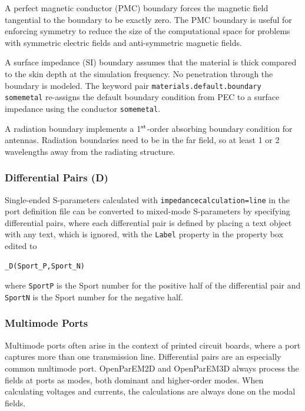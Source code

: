 \documentclass[titlepage]{article}
\renewcommand\_{\textunderscore\linebreak[1]}
\begin{document}
A perfect magnetic conductor (PMC) boundary forces the magnetic field tangential to the boundary to be exactly zero.  The PMC boundary is useful for enforcing symmetry to reduce the size of the computational space for problems with symmetric electric fields and anti-symmetric magnetic fields.

A surface impedance (SI) boundary assumes that the material is thick compared to the skin depth at the simulation frequency.  No penetration through the boundary is modeled.  The keyword pair \newline \texttt{materials.default.boundary some\_metal} re-assigns the default boundary condition from PEC to a surface impedance using the conductor \texttt{some\_metal}.

A radiation boundary implements a 1$^{\textnormal{st}}$-order absorbing boundary condition for antennas.  Radiation boundaries need to be in the far field, so at least 1 or 2 wavelengths away from the radiating structure. 
\subsubsection{Differential Pairs (\_D)}

Single-ended S-parameters calculated with \texttt{impedance\_calculation=line} in the port definition file can be converted to mixed-mode S-parameters by specifying differential pairs, where each differential pair is defined by placing a text object with any text, which is ignored, with the \texttt{Label} property in the property box edited to
\begin{Verbatim}[fontsize=\small]
  _D(Sport_P,Sport_N)
\end{Verbatim}
\noindent where \texttt{Sport\_P} is the Sport number for the positive half of the differential pair and \texttt{Sport\_N} is the Sport number for the negative half.

\subsubsection{Multimode Ports}
\label{sec:multimode_ports}

Multimode ports often arise in the context of printed circuit boards, where a port captures more than one transmission line.  Differential pairs are an especially common multimode port.  OpenParEM2D and OpenParEM3D always process the fields at ports as modes, both dominant and higher-order modes. When calculating voltages and currents, the calculations are always done on the modal fields.
\end{document}
